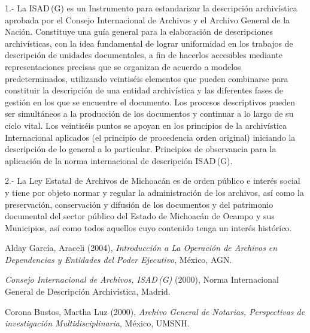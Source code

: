 \enlargethispage{1\baselineskip}

\medskip
\begin{Obs} 
\item[1.-] La ISAD\,(G) es un Instrumento para estandarizar la 
descripción archivística aprobada por el Consejo Internacional de 
Archivos y el \hbox{Archivo} General de la Nación. Constituye una guía general 
para la elaboración de descripciones archivísticas, con la idea 
fundamental de lograr uniformidad en los trabajos de descripción de 
unidades documentales, a fin de hacerlos accesibles mediante 
representaciones precisas que se organizan de acuerdo a modelos 
predeterminados, utilizando veintiséis elementos que pueden combinarse 
para constituir la descripción de una entidad archivística y las 
diferentes fases de gestión en los que se encuentre el documento. Los 
procesos descriptivos pueden ser simultáneos a la producción de los 
documentos y continuar a lo largo de su ciclo vital. Los veintiséis 
puntos se apoyan en los principios de la archivística Internacional 
aplicados (el principio de procedencia orden original) iniciando la 
descripción de lo general a lo particular. Principios de observancia 
para la aplicación de la norma internacional de descripción ISAD\,(G).
\enlargethispage{-1\baselineskip}


\item[2.-] La Ley Estatal de Archivos de Michoacán es de 
orden público e interés social y tiene por objeto normar y regular la 
administración de los archivos, así como la preservación, conservación 
y difusión de los documentos y del patrimonio documental del sector 
público del Estado de Michoacán de Ocampo y sus Municipios, así como 
todos aquellos cuyo contenido tenga un interés histórico.
\end{Obs}
\newpage


\medskip
Alday García, Araceli (2004), \textit{Introducción a La Operación de Archivos en
Dependencias y Entidades del Poder Ejecutivo}, México, AGN.

\textit{Consejo Internacional de Archivos, ISAD\,(G)} (2000), Norma Internacional
General de Descripción Archivística, Madrid.

Corona Bustos, Martha Luz (2000), \textit{Archivo General de Notarias, Perspectivas de
investigación Multidisciplinaria}, México, UMSNH.

